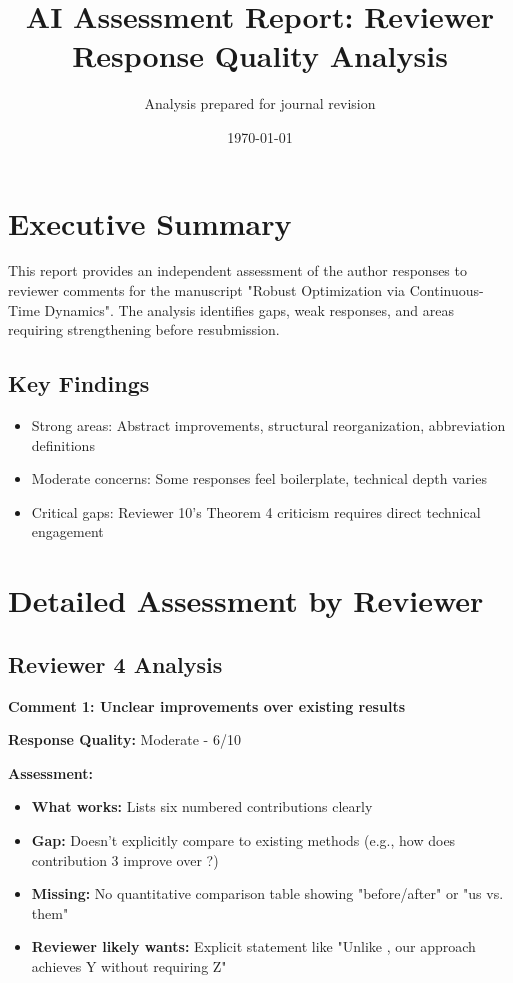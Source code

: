 \documentclass[11pt]{article}
\title{AI Assessment Report: Reviewer Response Quality Analysis}
\author{Analysis prepared for journal revision}
\date{\today}
\begin{document}
\maketitle

\section{Executive Summary}

This report provides an independent assessment of the author responses to reviewer comments for the manuscript "Robust Optimization via Continuous-Time Dynamics". The analysis identifies gaps, weak responses, and areas requiring strengthening before resubmission.

\subsection{Key Findings}

\begin{itemize}
\item \textcolor{success}{Strong areas}: Abstract improvements, structural reorganization, abbreviation definitions
\item \textcolor{warning}{Moderate concerns}: Some responses feel boilerplate, technical depth varies
\item \textcolor{critical}{Critical gaps}: Reviewer 10's Theorem 4 criticism requires direct technical engagement
\end{itemize}

\section{Detailed Assessment by Reviewer}

\subsection{Reviewer 4 Analysis}

\textbf{Comment 1: Unclear improvements over existing results}

\textbf{Response Quality:} \textcolor{warning}{Moderate - 6/10}

\textbf{Assessment:}
\begin{itemize}[leftmargin=*]
\item \textbf{What works:} Lists six numbered contributions clearly
\item \textbf{Gap:} Doesn't explicitly compare to existing methods (e.g., how does contribution 3 improve over \cite{bental2009}?)
\item \textbf{Missing:} No quantitative comparison table showing "before/after" or "us vs. them"
\item \textbf{Reviewer likely wants:} Explicit statement like "Unlike \cite{X}, our approach achieves Y without requiring Z"
\end{itemize}
\end{document}
